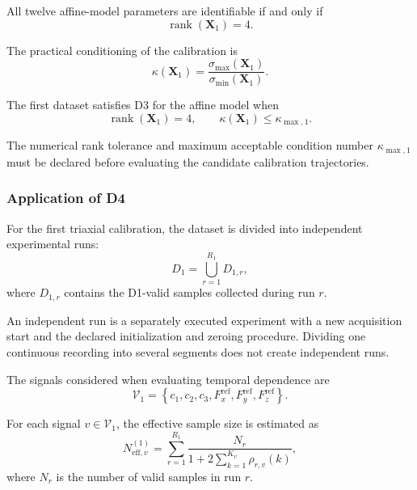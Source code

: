 \documentclass[11pt,a4paper]{article}
\begin{document}
All twelve affine-model parameters are identifiable if and only if
\begin{equation}
    \operatorname{rank}(\mathbf{X}_1)=4.
\end{equation}

The practical conditioning of the calibration is
\begin{equation}
    \kappa(\mathbf{X}_1)
    =
    \frac{\sigma_{\max}(\mathbf{X}_1)}
         {\sigma_{\min}(\mathbf{X}_1)}.
\end{equation}

The first dataset satisfies D3 for the affine model when
\begin{equation}
    \operatorname{rank}(\mathbf{X}_1)=4,
    \qquad
    \kappa(\mathbf{X}_1)
    \leq
    \kappa_{\max,1}.
\end{equation}

The numerical rank tolerance and maximum acceptable condition number
$\kappa_{\max,1}$ must be declared before evaluating the candidate calibration
trajectories.

\subsubsection{Application of D4}

For the first triaxial calibration, the dataset is divided into independent
experimental runs:
\begin{equation}
    D_1
    =
    \bigcup_{r=1}^{R_1}D_{1,r},
\end{equation}
where $D_{1,r}$ contains the D1-valid samples collected during run $r$.

An independent run is a separately executed experiment with a new acquisition
start and the declared initialization and zeroing procedure. Dividing one
continuous recording into several segments does not create independent runs.

The signals considered when evaluating temporal dependence are
\begin{equation}
    \mathcal{V}_1
    =
    \left\{
        c_1,c_2,c_3,
        F_x^{\mathrm{ref}},
        F_y^{\mathrm{ref}},
        F_z^{\mathrm{ref}}
    \right\}.
\end{equation}

For each signal $v\in\mathcal{V}_1$, the effective sample size is estimated as
\begin{equation}
    N_{\mathrm{eff},v}^{(1)}
    =
    \sum_{r=1}^{R_1}
    \frac{N_r}
    {
        1
        +
        2\sum_{k=1}^{K_v}\rho_{r,v}(k)
    },
\end{equation}
where $N_r$ is the number of valid samples in run $r$.
\end{document}
